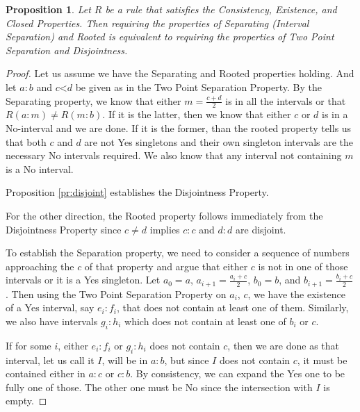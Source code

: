 \documentclass[12pt]{article}
\newtheorem{proposition}{Proposition}
\theoremstyle{remark}
\newcommand{\lt}{\mathord{<}}
\begin{document}
\begin{proposition}
    Let $R$ be a rule that satisfies the Consistency, Existence, and Closed Properties. Then requiring the properties of Separating (Interval Separation) and Rooted is equivalent to requiring the properties of Two Point Separation and Disjointness. 
\end{proposition}

\begin{proof}
    Let us assume we have the Separating and Rooted properties holding. And let $a:b$ and $c\lt d$ be given as in the Two Point Separation Property. By the Separating property, we know that either $m =\frac{c+d}{2}$ is in all the intervals or that $R(a:m) \neq R(m:b)$. If it is the latter, then we know that either $c$ or $d$ is in a No-interval and we are done. If it is the former, than the rooted property tells us that both $c$ and $d$ are not Yes singletons and their own singleton intervals are the necessary No intervals required. We also know that any interval not containing $m$ is a No interval. 
    
    Proposition \ref{pr:disjoint} establishes the Disjointness Property. 

    For the other direction, the Rooted property follows immediately from the Disjointness Property since $c \neq d$ implies $c:c$ and $d:d$ are disjoint. 
    
    To establish the Separation property, we need to consider a sequence of numbers approaching the $c$ of that property and argue that either $c$ is not in one of those intervals or it is a Yes singleton. Let $a_0=a$, $a_{i+1} = \frac{a_i + c}{2}$, $b_0 = b$, and $b_{i+1} = \frac{b_i + c}{2}$. Then using the Two Point Separation Property on $a_i$, $c$, we have the existence of a Yes interval, say $e_i:f_i$, that does not contain at least one of them. Similarly, we also have intervals $g_i:h_i$ which does not contain at least one of $b_i$ or $c$. 
    
    If for some $i$,  either $e_i:f_i$ or $g_i:h_i$ does not contain $c$, then we are done as that interval, let us call it $I$,  will be in $a:b$, but since $I$ does not contain $c$, it must be contained either in $a:c$ or $c:b$. By consistency, we can expand the Yes one to be fully one of those. The other one must be No since the intersection with $I$ is empty. 
    

\end{proof}
\end{document}
